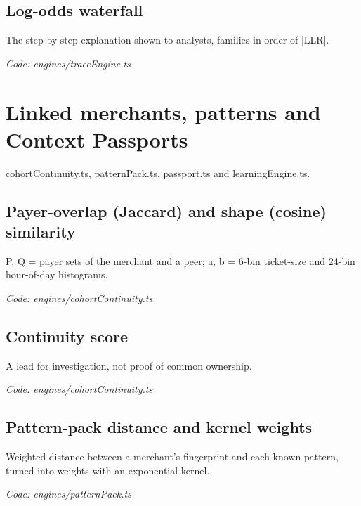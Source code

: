 \documentclass[11pt,a4paper]{article}
\newcommand{\where}[1]{\par{\small\itshape\color{mute}Code: #1}\par}
\begin{document}
\subsection*{Log-odds waterfall}
\par\smallskip\noindent{}\par\smallskip
The step-by-step explanation shown to analysts, families in order of |LLR|.
\where{engines/traceEngine.ts}

\clearpage
\section{Linked merchants, patterns and Context Passports}
{\color{mute}cohortContinuity.ts, patternPack.ts, passport.ts and learningEngine.ts.}

\subsection*{Payer-overlap (Jaccard) and shape (cosine) similarity}
\par\smallskip\noindent{}\par\smallskip
P, Q = payer sets of the merchant and a peer; a, b = 6-bin ticket-size and 24-bin hour-of-day histograms.
\where{engines/cohortContinuity.ts}

\subsection*{Continuity score}
\par\smallskip\noindent{}\par\smallskip
A lead for investigation, not proof of common ownership.
\where{engines/cohortContinuity.ts}

\subsection*{Pattern-pack distance and kernel weights}
\par\smallskip\noindent{}\par\smallskip
\par\smallskip\noindent{}\par\smallskip
Weighted distance between a merchant's fingerprint and each known pattern, turned into weights with an exponential kernel.
\where{engines/patternPack.ts}
\end{document}
